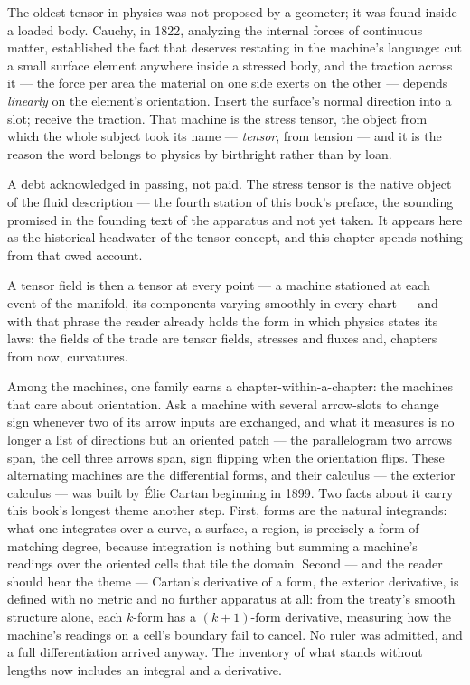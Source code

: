 The oldest tensor in physics was not proposed by a geometer; it was found
inside a loaded body. Cauchy, in 1822, analyzing the internal forces of
continuous matter, established the fact that deserves restating in the
machine's language: cut a small surface element anywhere inside a stressed
body, and the traction across it --- the force per area the material on one
side exerts on the other --- depends \emph{linearly} on the element's
orientation. Insert the surface's normal direction into a slot; receive the
traction. That machine is the stress tensor, the object from which the
whole subject took its name --- \emph{tensor}, from tension --- and it is
the reason the word belongs to physics by birthright rather than by loan.

\begin{fence}
A debt acknowledged in passing, not paid. The stress tensor is the native
object of the fluid description --- the fourth station of this book's
preface, the sounding promised in the founding text of the apparatus and
not yet taken. It appears here as the historical headwater of the tensor
concept, and this chapter spends nothing from that owed account.
\end{fence}

A tensor field is then a tensor at every point --- a machine stationed at
each event of the manifold, its components varying smoothly in every chart
--- and with that phrase the reader already holds the form in which physics
states its laws: the fields of the trade are tensor fields, stresses and
fluxes and, chapters from now, curvatures.

Among the machines, one family earns a chapter-within-a-chapter: the
machines that care about orientation. Ask a machine with several
arrow-slots to change sign whenever two of its arrow inputs are exchanged,
and what it measures is no longer a list of directions but an oriented
patch --- the parallelogram two arrows span, the cell three arrows span,
sign flipping when the orientation flips. These alternating machines are
the differential forms, and their calculus --- the exterior calculus ---
was built by \'Elie Cartan beginning in 1899. Two facts about it carry this
book's longest theme another step. First, forms are the natural integrands:
what one integrates over a curve, a surface, a region, is precisely a form
of matching degree, because integration is nothing but summing a machine's
readings over the oriented cells that tile the domain. Second --- and the
reader should hear the theme --- Cartan's derivative of a form, the
exterior derivative, is defined with no metric and no further apparatus at
all: from the treaty's smooth structure alone, each $k$-form has a
$(k{+}1)$-form derivative, measuring how the machine's readings on a cell's
boundary fail to cancel. No ruler was admitted, and a full differentiation
arrived anyway. The inventory of what stands without lengths now includes
an integral and a derivative.

